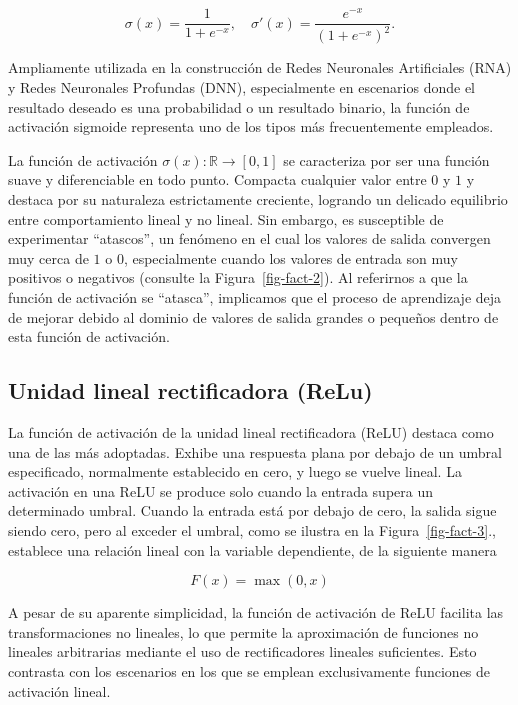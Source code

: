 \documentclass[
  us-letterpaper,
]{scrreprt}
\theoremstyle{definition}
\theoremstyle{plain}
\theoremstyle{plain}
\theoremstyle{definition}
\theoremstyle{remark}
\begin{document}
\[\sigma(x) = \frac{1}{1+e^{-x}}, \quad \sigma'(x) = \frac{e^{-x}}{(1+e^{-x})^2}.\]

Ampliamente utilizada en la construcción de Redes Neuronales
Artificiales (RNA) y Redes Neuronales Profundas (DNN), especialmente en
escenarios donde el resultado deseado es una probabilidad o un resultado
binario, la función de activación sigmoide representa uno de los tipos
más frecuentemente empleados.

La función de activación \(\sigma(x):\mathbb R\to [0,1]\) se caracteriza
por ser una función suave y diferenciable en todo punto. Compacta
cualquier valor entre \(0\) y \(1\) y destaca por su naturaleza
estrictamente creciente, logrando un delicado equilibrio entre
comportamiento lineal y no lineal. Sin embargo, es susceptible de
experimentar ``atascos'', un fenómeno en el cual los valores de salida
convergen muy cerca de \(1\) o \(0\), especialmente cuando los valores
de entrada son muy positivos o negativos (consulte la
Figura~\ref{fig-fact-2}). Al referirnos a que la función de activación
se ``atasca'', implicamos que el proceso de aprendizaje deja de mejorar
debido al dominio de valores de salida grandes o pequeños dentro de esta
función de activación.

\subsection{Unidad lineal rectificadora
(ReLu)}\label{unidad-lineal-rectificadora-relu}

La función de activación de la unidad lineal rectificadora (ReLU)
destaca como una de las más adoptadas. Exhibe una respuesta plana por
debajo de un umbral especificado, normalmente establecido en cero, y
luego se vuelve lineal. La activación en una ReLU se produce solo cuando
la entrada supera un determinado umbral. Cuando la entrada está por
debajo de cero, la salida sigue siendo cero, pero al exceder el umbral,
como se ilustra en la Figura~\ref{fig-fact-3}., establece una relación
lineal con la variable dependiente, de la siguiente manera

\[
F(x)=\max(0,x)
\]

A pesar de su aparente simplicidad, la función de activación de ReLU
facilita las transformaciones no lineales, lo que permite la
aproximación de funciones no lineales arbitrarias mediante el uso de
rectificadores lineales suficientes. Esto contrasta con los escenarios
en los que se emplean exclusivamente funciones de activación lineal.
\end{document}
